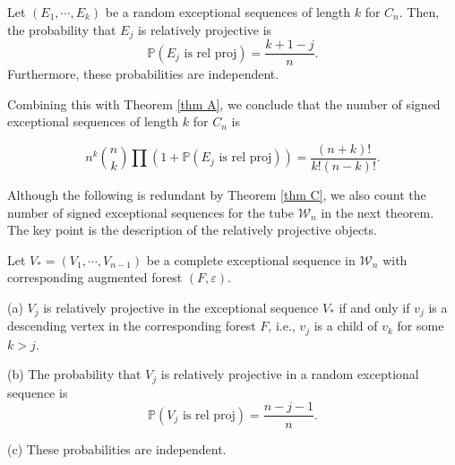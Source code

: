 \documentclass[11pt]{amsart}
\newenvironment{customthm}[1]
    {\renewcommand
    \theinnercustomthm{#1}\innercustomthm}{\endinnercustomthm}
\theoremstyle{definition}
\theoremstyle{remark}
\numberwithin{equation}{section}
\newcommand{\field}[1]{\mathbb{#1}}
\newcommand{\PP}{\ensuremath{{\field{P}}}}
\newcommand{\cW}{\ensuremath{{\mathcal{W}}}}
\begin{document}
\begin{customthm}{E}\label{thm E}
Let $(E_1,\cdots,E_k)$ be a random exceptional sequences of length $k$ for $C_n$. Then, the probability that $E_j$ is relatively projective is
\[
	\mathbb P(E_j\text{ is rel proj})={\frac{k+1-j}n}.
\]
Furthermore, these probabilities are independent.
\end{customthm}

Combining this with Theorem \ref{thm A}, we conclude that the number of signed exceptional sequences of length $k$ for $C_n$ is

\begin{equation}\label{eq: number of length k signed exc seq}
	n^k\binom{n}k\prod (1+\PP(E_j\text{ is rel proj}))=\frac{(n+k)!}{k!(n-k)!}.
\end{equation}


Although the following is redundant by Theorem \ref{thm C}, we also count the number of signed exceptional sequences for the tube $\cW_n$ in the next theorem. The key point is the description of the relatively projective objects.

\begin{customthm}{F}\label{thm F}
Let $V_\ast=(V_1,\cdots,V_{n-1})$ be a complete exceptional sequence in $\cW_n$ with corresponding augmented forest $(F,\varepsilon)$.

(a) $V_j$ is relatively projective in the exceptional sequence $V_\ast$ if and only if $v_j$ is a descending vertex in the corresponding forest $F$, i.e., $v_j$ is a child of $v_k$ for some $k>j$.

(b) The probability that $V_j$ is relatively projective in a random exceptional sequence is
\[
	\mathbb P(V_j\text{ is rel proj})={\frac{n-j-1}n}.
\]

(c) These probabilities are independent.
\end{customthm}
\end{document}
